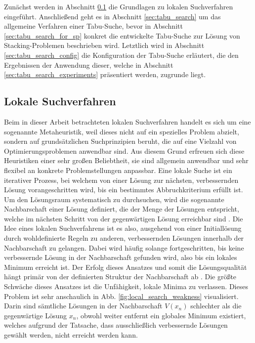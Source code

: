Zunächst werden in Abschnitt \ref{sec:local_search} die Grundlagen zu lokalen Suchverfahren eingeführt.
Anschließend geht es in Abschnitt \ref{sec:tabu_search} um das allgemeine Verfahren einer Tabu-Suche,
bevor in Abschnitt \ref{sec:tabu_search_for_sp} konkret die entwickelte Tabu-Suche zur Lösung von Stacking-Problemen
beschrieben wird. Letztlich wird in Abschnitt \ref{sec:tabu_search_config} die Konfiguration der Tabu-Suche erläutert,
die den Ergebnissen der Anwendung dieser, welche in Abschnitt \ref{sec:tabu_search_experiments} präsentiert werden,
zugrunde liegt.

\subsection{Lokale Suchverfahren}
\label{sec:local_search}

Beim in dieser Arbeit betrachteten lokalen Suchverfahren handelt es sich um eine sogenannte Metaheuristik,
weil dieses nicht auf ein spezielles Problem abzielt, sondern auf grundsätzlichen Suchprinzipien beruht,
die auf eine Vielzahl von Optimierungsproblemen anwendbar sind. Aus diesem Grund erfreuen sich diese Heuristiken einer sehr großen Beliebtheit, sie sind allgemein anwendbar und sehr flexibel an konkrete Problemstellungen anpassbar.
Eine lokale Suche ist ein iterativer Prozess, bei welchem von einer Lösung zur nächsten, verbessernden Lösung vorangeschritten wird, bis ein bestimmtes Abbruchkriterium erfüllt ist. Um den Lösungsraum systematisch zu durchsuchen, wird die
sogenannte Nachbarschaft einer Lösung definiert, die der Menge der Lösungen entspricht, welche im nächsten Schritt
von der gegenwärtigen Lösung erreichbar sind \cite{Brucker2006}.
Die Idee eines lokalen Suchverfahrens ist es also, ausgehend von einer Initiallösung durch wohldefinierte Regeln zu anderen,
verbessernden Lösungen innerhalb der Nachbarschaft zu gelangen. Dabei wird häufig solange fortgeschritten, bis keine verbessernde Lösung in der Nachbarschaft gefunden wird, also bis ein lokales Minimum erreicht ist.
Der Erfolg dieses Ansatzes und somit die Lösungsqualität hängt primär von der definierten Struktur
der Nachbarschaft ab \cite{Pirlot1996}.
Die größte Schwäche dieses Ansatzes ist die Unfähigkeit, lokale Minima zu verlassen. Dieses Problem ist sehr
anschaulich in Abb. \ref{fig:local_search_weakness} visualisiert. Darin sind sämtliche Lösungen in der
Nachbarschaft $V(x_n)$ schlechter als die gegenwärtige Lösung $x_n$, obwohl weiter entfernt ein globales Minimum
existiert, welches aufgrund der Tatsache, dass ausschließlich verbessernde Lösungen gewählt werden,
nicht erreicht werden kann.

